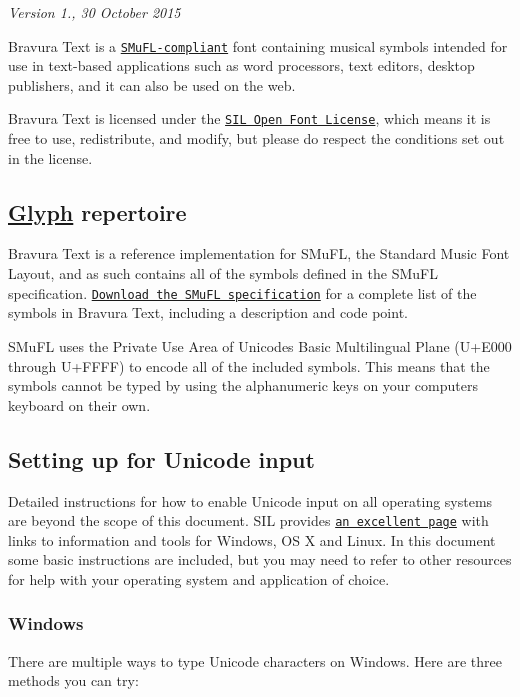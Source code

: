 {\itshape Version 1., 30 October 2015}

Bravura Text is a \href{http://www.smufl.org/}{\tt S\+Mu\+F\+L-\/compliant} font containing musical symbols intended for use in text-\/based applications such as word processors, text editors, desktop publishers, and it can also be used on the web.

Bravura Text is licensed under the \href{http://scripts.sil.org/}{\tt S\+IL Open Font License}, which means it is free to use, redistribute, and modify, but please do respect the conditions set out in the license.

\subsection*{\hyperlink{struct_glyph}{Glyph} repertoire}

Bravura Text is a reference implementation for S\+Mu\+FL, the Standard Music Font Layout, and as such contains all of the symbols defined in the S\+Mu\+FL specification. \href{http://www.smufl.org/files/smufl-0.9.pdf}{\tt Download the S\+Mu\+FL specification} for a complete list of the symbols in Bravura Text, including a description and code point.

S\+Mu\+FL uses the Private Use Area of Unicode\textquotesingle{}s Basic Multilingual Plane (U+\+E000 through U+\+F\+F\+FF) to encode all of the included symbols. This means that the symbols cannot be typed by using the alphanumeric keys on your computer\textquotesingle{}s keyboard on their own.

\subsection*{Setting up for Unicode input}

Detailed instructions for how to enable Unicode input on all operating systems are beyond the scope of this document. S\+IL provides \href{http://scripts.sil.org/cms/scripts/page.php?item_id=inputtoollinks}{\tt an excellent page} with links to information and tools for Windows, OS X and Linux. In this document some basic instructions are included, but you may need to refer to other resources for help with your operating system and application of choice.

\subsubsection*{Windows}

There are multiple ways to type Unicode characters on Windows. Here are three methods you can try\+:

